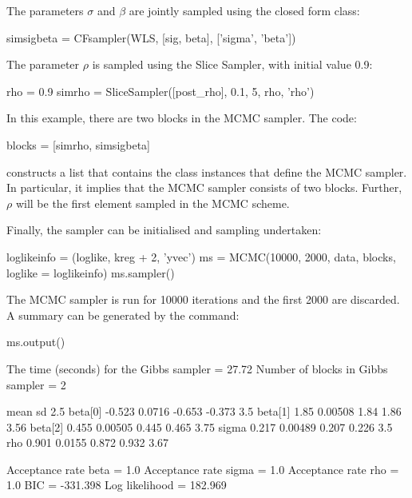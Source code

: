\documentclass[article]{jss}
\begin{document}
The parameters $\sigma$ and $\beta$ are jointly sampled using the
closed form class:
\begin{Code}
simsigbeta = CFsampler(WLS, [sig, beta], ['sigma', 'beta'])
\end{Code}

The parameter $\rho$ is sampled using the Slice Sampler, with initial value 0.9:
\begin{Code}
rho = 0.9
simrho = SliceSampler([post_rho], 0.1, 5, rho, 'rho')
\end{Code}

In this example, there are two blocks in the MCMC sampler. The code:
\begin{Code}
blocks = [simrho, simsigbeta]
\end{Code}
constructs a  list that contains the
class instances that define the MCMC sampler. In particular, it
implies that the MCMC sampler consists of two blocks. Further,
$\rho$ will be the first element sampled in the MCMC scheme.


Finally, the sampler can be initialised and sampling undertaken:

\begin{Code}
loglikeinfo = (loglike, kreg + 2, 'yvec')
ms = MCMC(10000, 2000, data, blocks, loglike = loglikeinfo)
ms.sampler()
\end{Code}


The MCMC sampler is run for 10000
iterations and the first 2000 are discarded. A summary can be generated by the  command:

\begin{CodeChunk}
\begin{CodeInput}
ms.output()
\end{CodeInput}
\begin{CodeOutput}
The time (seconds) for the Gibbs sampler =  27.72
Number of blocks in Gibbs sampler =  2

                mean        sd       2.5%
   beta[0]    -0.523    0.0716     -0.653    -0.373        3.5
   beta[1]      1.85   0.00508       1.84      1.86       3.56
   beta[2]     0.455   0.00505      0.445     0.465       3.75
     sigma     0.217   0.00489      0.207     0.226        3.5
       rho     0.901    0.0155      0.872     0.932       3.67

Acceptance rate  beta  =  1.0
Acceptance rate  sigma  =  1.0
Acceptance rate  rho  =  1.0
BIC =  -331.398
Log likelihood =   182.969

\end{CodeOutput}
\end{CodeChunk}
\end{document}
